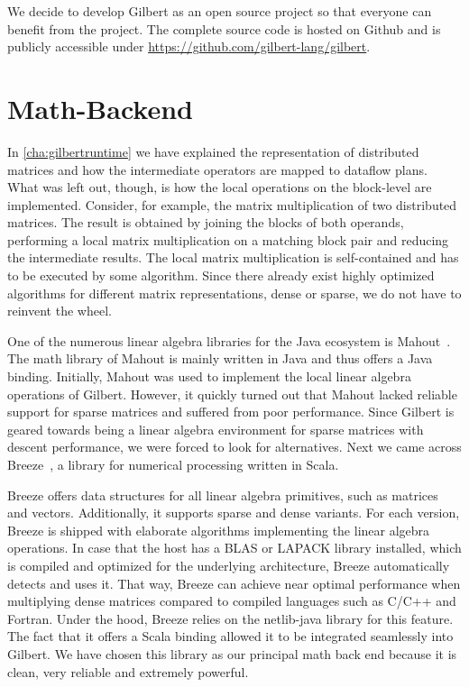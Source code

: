 We decide to develop Gilbert as an open source project so that everyone can benefit from the project.
The complete source code is hosted on Github and is publicly accessible under \url{https://github.com/gilbert-lang/gilbert}.

\section{Math-Backend}
\label{sec:mathBackend}

In \cref{cha:gilbertruntime} we have explained the representation of distributed matrices and how the intermediate operators are mapped to dataflow plans.
What was left out, though, is how the local operations on the block-level are implemented.
Consider, for example, the matrix multiplication of two distributed matrices.
The result is obtained by joining the blocks of both operands, performing a local matrix multiplication on a matching block pair and reducing the intermediate results.
The local matrix multiplication is self-contained and has to be executed by some algorithm.
Since there already exist highly optimized algorithms for different matrix representations, dense or sparse, we do not have to reinvent the wheel.

One of the numerous linear algebra libraries for the Java ecosystem is Mahout~\cite{mahout:2011a}.
The math library of Mahout is mainly written in Java and thus offers a Java binding.
Initially, Mahout was used to implement the local linear algebra operations of Gilbert.
However, it quickly turned out that Mahout lacked reliable support for sparse matrices and suffered from poor performance.
Since Gilbert is geared towards being a linear algebra environment for sparse matrices with descent performance, we were forced to look for alternatives.
Next we came across Breeze~\cite{breeze}, a library for numerical processing written in Scala.

Breeze offers data structures for all linear algebra primitives, such as matrices and vectors.
Additionally, it supports sparse and dense variants.
For each version, Breeze is shipped with elaborate algorithms implementing the linear algebra operations.
In case that the host has a BLAS or LAPACK library installed, which is compiled and optimized for the underlying architecture, Breeze automatically detects and uses it.
That way, Breeze can achieve near optimal performance when multiplying dense matrices compared to compiled languages such as C/C++ and Fortran.
Under the hood, Breeze relies on the netlib-java library for this feature.
The fact that it offers a Scala binding allowed it to be integrated seamlessly into Gilbert.
We have chosen this library as our principal math back end because it is clean, very reliable and extremely powerful.

